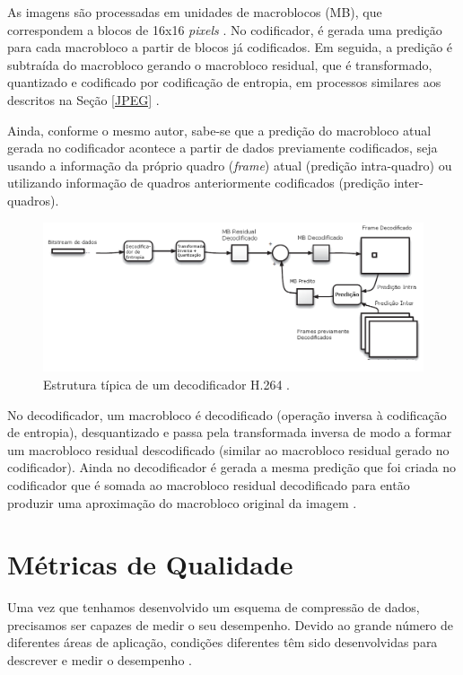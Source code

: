As imagens são processadas em unidades de macroblocos (MB), que correspondem a blocos de 16x16 \textit{pixels} \cite{richardson2011h}. No codificador, é gerada uma predição para cada macrobloco a partir de blocos já codificados. Em seguida, a predição é subtraída do macrobloco gerando o macrobloco residual, que é transformado, quantizado e codificado por codificação de entropia, em processos similares aos descritos na Seção \ref{JPEG} .

Ainda, conforme o mesmo autor, sabe-se que a predição do macrobloco atual gerada no codificador acontece a partir de dados previamente codificados, seja usando a informação da próprio quadro (\textit{frame}) atual (predição intra-quadro) ou utilizando informação de quadros anteriormente codificados (predição inter-quadros).
  
\begin{figure}[h]
	\centering
	\includegraphics[scale=0.45]{figuras/H264_DECODIFICADOR.png}
	\caption{Estrutura típica de um decodificador H.264 \cite{richardson2011h}.}
	\label{H264_DECODER}
\end{figure}

No decodificador, um macrobloco é decodificado (operação inversa à codificação de entropia), desquantizado e passa pela transformada inversa de modo a formar um macrobloco residual descodificado (similar ao macrobloco residual gerado no codificador). Ainda no decodificador é gerada a mesma predição que foi criada no codificador que é somada ao macrobloco residual decodificado para então produzir uma aproximação do macrobloco original da imagem \cite{richardson2011h}.

\section{Métricas de Qualidade}
Uma vez que tenhamos desenvolvido um esquema de compressão de dados, precisamos ser capazes de medir o seu desempenho. Devido ao grande número de diferentes áreas de aplicação, condições diferentes têm sido desenvolvidas para descrever e medir o desempenho \cite{sayood2012introduction}.

